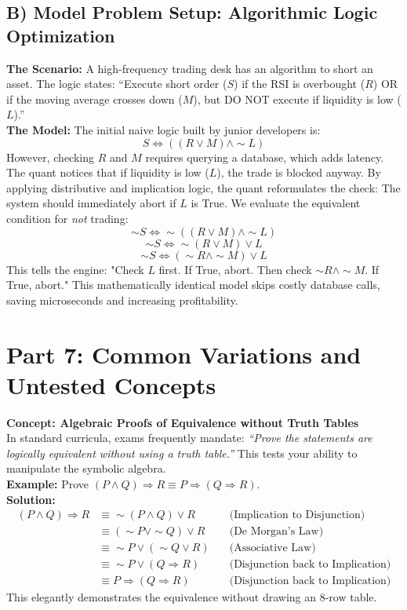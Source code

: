 \documentclass{article}
\begin{document}
\subsection*{B) Model Problem Setup: Algorithmic Logic Optimization}
\textbf{The Scenario:} A high-frequency trading desk has an algorithm to short an asset. The logic states: ``Execute short order ($S$) if the RSI is overbought ($R$) OR if the moving average crosses down ($M$), but DO NOT execute if liquidity is low ($L$).'' 
\\
\textbf{The Model:}
The initial naive logic built by junior developers is:
\[ S \Leftrightarrow ((R \lor M) \land \sim L) \]
However, checking $R$ and $M$ requires querying a database, which adds latency. The quant notices that if liquidity is low ($L$), the trade is blocked anyway. By applying distributive and implication logic, the quant reformulates the check:
The system should immediately abort if $L$ is True. We evaluate the equivalent condition for \textit{not} trading:
\[ \sim S \Leftrightarrow \sim((R \lor M) \land \sim L) \]
\[ \sim S \Leftrightarrow \sim(R \lor M) \lor L \]
\[ \sim S \Leftrightarrow (\sim R \land \sim M) \lor L \]
This tells the engine: "Check $L$ first. If True, abort. Then check $\sim R \land \sim M$. If True, abort." This mathematically identical model skips costly database calls, saving microseconds and increasing profitability.

\section*{Part 7: Common Variations and Untested Concepts}

\textbf{Concept: Algebraic Proofs of Equivalence without Truth Tables}\\
In standard curricula, exams frequently mandate: \textit{``Prove the statements are logically equivalent without using a truth table.''} This tests your ability to manipulate the symbolic algebra.
\\
\textbf{Example:} Prove $(P \land Q) \Rightarrow R \equiv P \Rightarrow (Q \Rightarrow R)$.
\\
\textbf{Solution:}
\begin{align*}
    (P \land Q) \Rightarrow R &\equiv \sim(P \land Q) \lor R \quad &\text{(Implication to Disjunction)} \\
    &\equiv (\sim P \lor \sim Q) \lor R \quad &\text{(De Morgan's Law)} \\
    &\equiv \sim P \lor (\sim Q \lor R) \quad &\text{(Associative Law)} \\
    &\equiv \sim P \lor (Q \Rightarrow R) \quad &\text{(Disjunction back to Implication)} \\
    &\equiv P \Rightarrow (Q \Rightarrow R) \quad &\text{(Disjunction back to Implication)}
\end{align*}
This elegantly demonstrates the equivalence without drawing an 8-row table.
\end{document}
